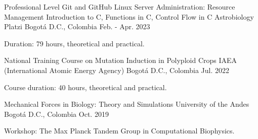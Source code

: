 \begin{cventries}
    
    \cventry
    {Professional Level Git and GitHub
    \newline
    Linux Server Administration: Resource Management
    \newline
    Introduction to C, Functions in C, Control Flow in C
    \newline
    Astrobiology} %
    {Platzi} %
    {Bogotá D.C., Colombia} %
    {Feb. - Apr. 2023} %
    { %
    \begin{cvitems}
    \item {Duration: 79 hours, theoretical and practical.}
    \end{cvitems}
    }
    
    
    \cventry
    {National Training Course on Mutation Induction in Polyploid Crops} %
    {IAEA (International Atomic Energy Agency)} %
    {Bogotá D.C., Colombia} %
    {Jul. 2022} %
    { %
    \begin{cvitems}
    \item {Course duration: 40 hours, theoretical and practical.}
    \end{cvitems}
    }
    
    
    \cventry
    {Mechanical Forces in Biology: Theory and Simulations} %
    {University of the Andes} %
    {Bogotá D.C., Colombia} %
    {Oct. 2019} %
    { %
    \begin{cvitems}
    \item {Workshop: The Max Planck Tandem Group in Computational Biophysics.}
    \end{cvitems}
    }
    
    
    \end{cventries}
    
